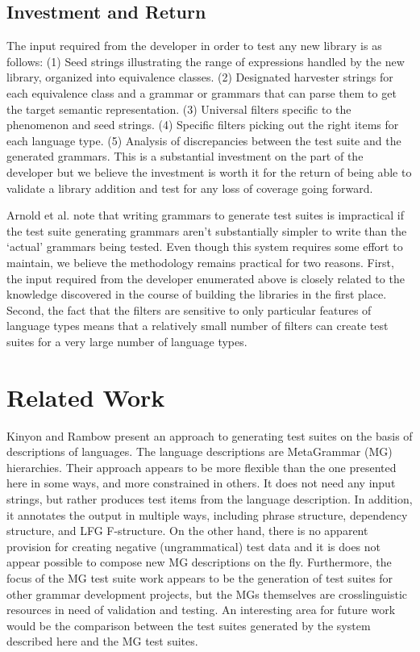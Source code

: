 \documentclass[11pt]{article}
\begin{document}
\subsection{Investment and Return}

The input required from the developer in order to
test any new library is as follows:
(1) Seed strings illustrating the range of expressions
handled by the new library, organized into equivalence
classes.
(2) Designated harvester strings for each equivalence class
and a grammar or grammars that can parse them to get
the target semantic representation.
(3) Universal filters specific to the phenomenon and
seed strings.
(4) Specific filters picking out the right items for
each language type.
(5) Analysis of discrepancies between the test suite
and the generated grammars.
This is a substantial investment on the part of the developer 
but we believe the investment is worth it for the return of being 
able to validate a library addition and test for any loss of coverage 
going forward.

Arnold et al.  note that writing grammars to
generate test suites is impractical if the test suite generating
grammars aren't substantially simpler to write than the `actual'
grammars being tested.  Even though this system requires some effort
to maintain, we believe the methodology remains practical for two reasons. 
First, the input required from the developer enumerated above is
closely related to the knowledge discovered in the course of building
the libraries in the first place.  Second, the fact that the filters
are sensitive to only particular features of language types means that
a relatively small number of filters can create test suites for a very
large number of language types.

\section{Related Work}
\label{rw}
Kinyon and Rambow  present an approach to
generating test suites on the basis of descriptions of languages.  The
language descriptions are MetaGrammar (MG) hierarchies. Their approach
appears to be more flexible than the one presented here in some ways,
and more constrained in others.  It does not need any input strings,
but rather produces test items from the language description. In
addition, it annotates the output in multiple ways, including phrase
structure, dependency structure, and LFG F-structure.  On the other
hand, there is no apparent provision for creating negative
(ungrammatical) test data and it is does not appear possible to
compose new MG descriptions on the fly.  Furthermore, the focus of the
MG test suite work appears to be the generation of test suites for
other grammar development projects, but the MGs themselves are
crosslinguistic resources in need of validation and testing. An
interesting area for future work would be the comparison between the
test suites generated by the system described here and the MG test
suites.
\end{document}
